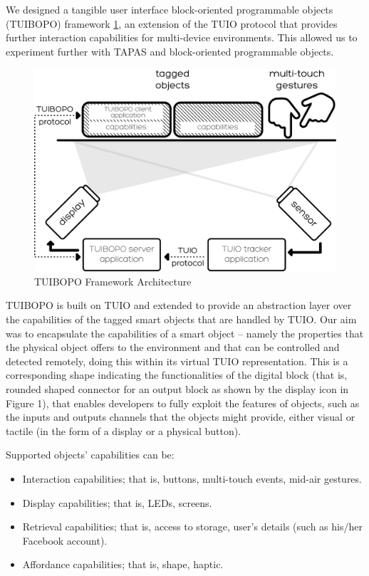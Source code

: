 We designed a tangible user interface block-oriented programmable objects (TUIBOPO) framework \ref{fig:tuibopo}, an extension of the TUIO protocol that provides further interaction capabilities for multi-device environments. This allowed us to experiment further with TAPAS and block-oriented programmable objects.

\begin{figure}[ht!]
\centering
\includegraphics[width=\textwidth]{images/c4/TUIBOPO.png}
\caption{TUIBOPO Framework Architecture}\label{fig:tuibopo}
\end{figure}

TUIBOPO is built on TUIO and extended to provide an abstraction layer over the capabilities of the tagged smart objects that are handled by TUIO. Our aim was to encapsulate the capabilities of a smart object -- namely the properties that the physical object offers to the environment and that can be controlled and detected remotely, doing this within its virtual TUIO representation. This is a corresponding shape indicating the functionalities of the digital block (that is, rounded shaped connector for an output block as shown by the display icon in Figure 1), that enables developers to fully exploit the features of objects, such as the inputs and outputs channels that the objects might provide, either visual or tactile (in the form of a display or a physical button). 

Supported objects’ capabilities can be:
\begin{itemize}
\item Interaction capabilities; that is, buttons, multi-touch events, mid-air gestures.
\item Display capabilities; that is, LEDs, screens.
\item Retrieval capabilities; that is, access to storage, user’s details (such as his/her Facebook account).
\item Affordance capabilities; that is, shape, haptic.
\end{itemize}

